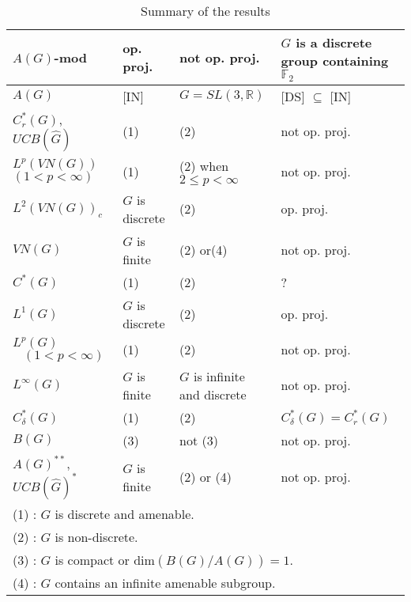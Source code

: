 \documentclass[10pt]{amsart}
\numberwithin{thm}{section}
\numberwithin{equation}{section}
\begin{document}
\begin{table}
\caption{Summary of the results}
\begin{tabular}{|p{2cm}|p{2cm}|p{3cm}||p{3cm}|}

\hline $A(G)$-{\bf mod} & op. proj. & not op. proj. & $G$ is a discrete group containing $\mathbb{F}_2$ \\

\hline $A(G)$ & [IN] & $G = SL(3,\mathbb{R})$ & [DS] $\subseteq$ [IN]\\

\hline $C^*_r(G)$, $UCB(\widehat{G})$ & (1) & (2) & not op. proj. \\

\hline $L^p(VN(G))$ $(1<p<\infty)$ & (1) & (2) \;\;\; when \;\;\;\;$2\le p <\infty$ & not op. proj. \\

\hline $L^2(VN(G))_c$ & $G$ is discrete & (2) & op. proj. \\

\hline $VN(G)$ & $G$ is finite & (2) or(4) & not op. proj. \\

\hline $C^*(G)$ & (1) & (2) & ? \\

\hline $L^1(G)$ & $G$ is discrete & (2) & op. proj. \\

\hline $L^p(G)$ $\;\;\;(1<p<\infty)$ & (1) & (2) & not op. proj. \\

\hline $L^\infty(G)$ & $G$ is finite & $G$ is infinite and discrete & not op. proj. \\

\hline $C^*_\delta (G)$ & (1) & (2) & $C^*_\delta(G) = C^*_r(G)$ \\

\hline $B(G)$ & (3) & not (3) & not op. proj.\\

\hline $A(G)^{**}$, $UCB(\widehat{G})^*$ & $G$ is finite & (2) or (4) & not op. proj.\\ 

\hline \multicolumn{4}{l}{(1) : $G$ is discrete and amenable.}\\

\hline \multicolumn{4}{l}{(2) : $G$ is non-discrete.}\\

\hline \multicolumn{4}{l}{(3) : $G$ is compact or $\text{dim}(B(G)/A(G)) = 1$.}\\

\hline \multicolumn{4}{l}{(4) : $G$ contains an infinite amenable subgroup.}\\

\hline
\end{tabular}

\end{table}
\end{document}

